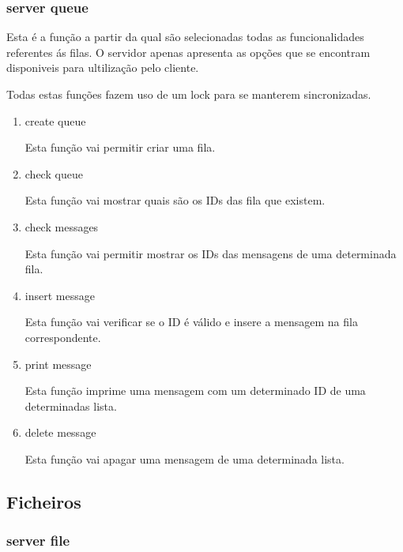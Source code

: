 \documentclass{article}
\begin{document}
\subsubsection{server queue}
\label{sec:org294ee08}

Esta é a função a partir da qual são selecionadas todas as funcionalidades referentes ás filas.
O servidor apenas apresenta as opções que se encontram disponiveis para ultilização pelo cliente.

Todas estas funções fazem uso de um lock para se manterem sincronizadas. \cite{Chapter13}

\begin{enumerate}
\item create queue
\label{sec:org6b36f13}

Esta função vai permitir criar uma fila.

\item check queue
\label{sec:orgf7fe930}

Esta função vai mostrar quais são os IDs das fila que existem.

\item check messages
\label{sec:org93ceaaf}

Esta função vai permitir mostrar os IDs das mensagens de uma determinada fila.

\item insert message
\label{sec:org14bbe7c}

Esta função vai verificar se o ID é válido e insere a mensagem na fila correspondente.

\item print message
\label{sec:orgf09f3bc}

Esta função imprime uma mensagem com um determinado ID de uma determinadas lista.

\item delete message
\label{sec:org58882b8}

Esta função vai apagar uma mensagem de uma determinada lista.
\end{enumerate}

\subsection{Ficheiros}
\label{sec:org33eb065}

\subsubsection{server file}
\label{sec:orgad34d3d}
\end{document}
